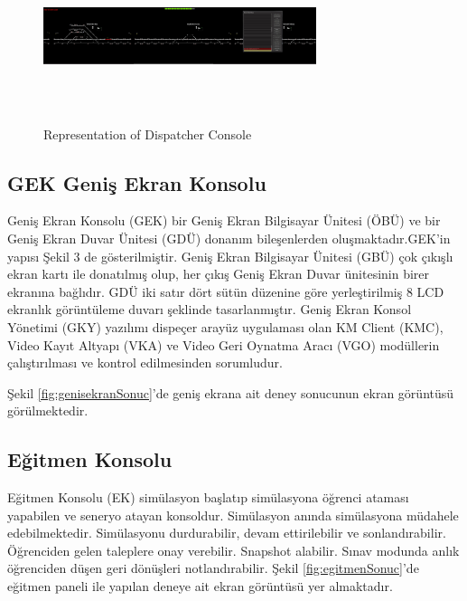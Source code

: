 \documentclass[conference]{IEEEtran}
\begin{document}
\begin{figure}[h!]
  \centering
  \includegraphics[width=8cm,height=5cm]{ogrenci.jpg}
  \caption{Representation of Dispatcher Console}\label{fig:smclass}
\end{figure}



\subsection{GEK Geniş Ekran Konsolu}

Geniş Ekran Konsolu (GEK) bir Geniş Ekran Bilgisayar Ünitesi (ÖBÜ) ve bir Geniş Ekran Duvar Ünitesi (GDÜ) donanım bileşenlerden oluşmaktadır.GEK’in yapısı Şekil 3 de gösterilmiştir.
Geniş Ekran Bilgisayar Ünitesi (GBÜ) çok çıkışlı ekran kartı ile donatılmış olup, her çıkış Geniş Ekran Duvar ünitesinin birer ekranına bağlıdır. GDÜ iki satır dört sütün düzenine göre yerleştirilmiş 8 LCD ekranlık görüntüleme duvarı şeklinde tasarlanmıştır. Geniş Ekran Konsol Yönetimi (GKY) yazılımı dispeçer arayüz uygulaması olan KM Client (KMC), Video Kayıt Altyapı (VKA) ve Video Geri Oynatma Aracı (VGO) modüllerin çalıştırılması ve kontrol edilmesinden sorumludur.


Şekil \ref{fig:genisekranSonuc}'de geniş ekrana ait deney sonucunun ekran görüntüsü görülmektedir.


\subsection{Eğitmen Konsolu}

Eğitmen Konsolu (EK) simülasyon başlatıp simülasyona öğrenci ataması yapabilen ve seneryo atayan konsoldur. Simülasyon anında simülasyona müdahele edebilmektedir. Simülasyonu durdurabilir, devam ettirilebilir ve sonlandırabilir. Öğrenciden gelen taleplere onay verebilir. Snapshot alabilir. Sınav modunda anlık öğrenciden düşen geri dönüşleri notlandırabilir. Şekil \ref{fig:egitmenSonuc}'de eğitmen paneli ile yapılan deneye ait ekran görüntüsü yer almaktadır.
\end{document}
